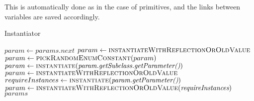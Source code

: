 This is automatically done as in the case of primitives, and the links between variables are saved accordingly.
\begin{algorithm}
	\caption{Instantiator}\label{psc:instantiator}
	\begin{algorithmic}[1]
			\State $param \gets \textit{params.next}$
				\State $param \gets \Call{instantiateWithReflectionOrOldValue}{}$
				\State $param \gets \Call{pickRandomEnumConstant}{param}$
				\State $param \gets \Call{instantiate}{\textit{param.getSubclass.getParameter()}}$
			\Else 
					\State $param \gets \Call{instantiateWithReflectionOrOldValue}{}$
				\Else 
					\State $requireInstances \gets \Call{instantiate}{\textit{param.getParameter()}}$
					\State $param \gets \Call{instantiateWithReflectionOrOldValue}{\textit{requireInstances}}$
				\EndIf
			\EndIf	
		\EndFor
		\Return $params$ 
		\EndProcedure
	\end{algorithmic}
\end{algorithm}

